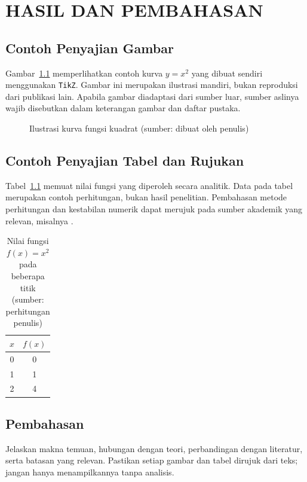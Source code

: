 \chapter{HASIL DAN PEMBAHASAN}
\section{Contoh Penyajian Gambar}
Gambar~\ref{fig:kurva} memperlihatkan contoh kurva $y=x^2$ yang dibuat sendiri menggunakan \texttt{TikZ}. Gambar ini merupakan ilustrasi mandiri, bukan reproduksi dari publikasi lain. Apabila gambar diadaptasi dari sumber luar, sumber aslinya wajib disebutkan dalam keterangan gambar dan daftar pustaka.
\begin{figure}[htbp]
\centering
{}
\caption{Ilustrasi kurva fungsi kuadrat (sumber: dibuat oleh penulis)}
\label{fig:kurva}
\end{figure}

\section{Contoh Penyajian Tabel dan Rujukan}
Tabel~\ref{tab:contoh} memuat nilai fungsi yang diperoleh secara analitik. Data pada tabel merupakan contoh perhitungan, bukan hasil penelitian. Pembahasan metode perhitungan dan kestabilan numerik dapat merujuk pada sumber akademik yang relevan, misalnya \cite{higham2002}.
\begin{table}[htbp]
\centering
\caption{Nilai fungsi $f(x)=x^2$ pada beberapa titik (sumber: perhitungan penulis)}
\label{tab:contoh}
\begin{tabular}{cc}
\toprule
$x$ & $f(x)$ \\
\midrule
0 & 0 \\
1 & 1 \\
2 & 4 \\
\bottomrule
\end{tabular}
\end{table}

\section{Pembahasan}
Jelaskan makna temuan, hubungan dengan teori, perbandingan dengan literatur, serta batasan yang relevan. Pastikan setiap gambar dan tabel dirujuk dari teks; jangan hanya menampilkannya tanpa analisis.
